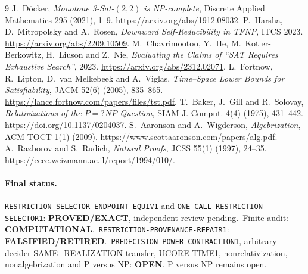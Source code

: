 \documentclass[11pt]{article}
\newcommand{\EXACT}{\textbf{PROVED/EXACT}}
\newcommand{\OPEN}{\textbf{OPEN}}
\newcommand{\RETIRED}{\textbf{FALSIFIED/RETIRED}}
\newcommand{\COMP}{\textbf{COMPUTATIONAL}}
\begin{document}
\begin{thebibliography}{9}
 J.~D\"ocker, \emph{Monotone 3-Sat-$(2,2)$ is NP-complete},
Discrete Applied Mathematics 295 (2021), 1--9.
\url{https://arxiv.org/abs/1912.08032}.
 P.~Harsha, D.~Mitropolsky and A.~Rosen,
\emph{Downward Self-Reducibility in TFNP}, ITCS 2023.
\url{https://arxiv.org/abs/2209.10509}.
 M.~Chavrimootoo, Y.~He, M.~Kotler-Berkowitz, H.~Liuson and
Z.~Nie, \emph{Evaluating the Claims of ``SAT Requires Exhaustive Search''},
2023. \url{https://arxiv.org/abs/2312.02071}.
 L.~Fortnow, R.~Lipton, D.~van Melkebeek and A.~Viglas,
\emph{Time--Space Lower Bounds for Satisfiability}, JACM 52(6) (2005),
835--865. \url{https://lance.fortnow.com/papers/files/tst.pdf}.
 T.~Baker, J.~Gill and R.~Solovay,
\emph{Relativizations of the $P=?NP$ Question}, SIAM J. Comput. 4(4)
(1975), 431--442. \url{https://doi.org/10.1137/0204037}.
 S.~Aaronson and A.~Wigderson, \emph{Algebrization},
ACM TOCT 1(1) (2009). \url{https://www.scottaaronson.com/papers/alg.pdf}.
 A.~Razborov and S.~Rudich, \emph{Natural Proofs}, JCSS 55(1)
(1997), 24--35. \url{https://eccc.weizmann.ac.il/report/1994/010/}.
\end{thebibliography}

\paragraph{Final status.}
\texttt{RESTRICTION-SELECTOR-ENDPOINT-EQUIV1} and
\texttt{ONE-CALL-RESTRICTION-SELECTOR1}: \EXACT, independent review pending.\
Finite audit: \COMP.\
\texttt{RESTRICTION-PROVENANCE-REPAIR1}: \RETIRED.\
\texttt{PREDECISION-POWER-CONTRACTION1}, arbitrary-decider SAME\_REALIZATION
transfer, UCORE-TIME1, nonrelativization, nonalgebrization and P versus NP:
\OPEN.  P versus NP remains open.

\end{document}
